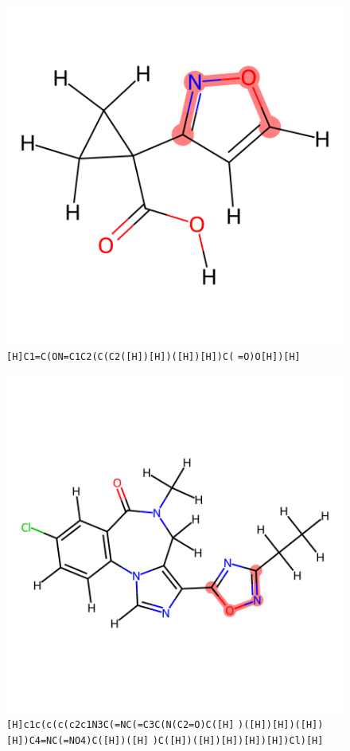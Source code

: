 \documentclass{article}
\begin{document}
\begin{figure}[ht]
\centering
    \includegraphics{mol00.png}
\cprotect\caption{\verb|[H]C1=C(ON=C1C2(C(C2([H])[H])([H])[H])C(| \verb|=O)O[H])[H]| }
\end{figure}

\begin{figure}[ht]
\centering
    \includegraphics{mol01.png}
\cprotect\caption{\verb|[H]c1c(c(c(c2c1N3C(=NC(=C3C(N(C2=O)C([H]| \verb|)([H])[H])([H])[H])C4=NC(=NO4)C([H])([H]| \verb|)C([H])([H])[H])[H])[H])Cl)[H]| }
\end{figure}
\end{document}

